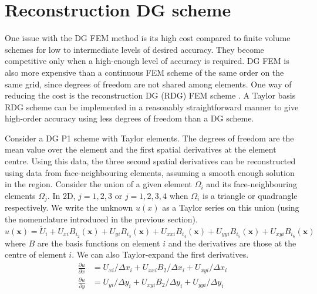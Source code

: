 \documentclass[11pt]{article}
\let\bld\boldsymbol
\begin{document}
\section{Reconstruction DG scheme}
One issue with the DG FEM method is its high cost compared to finite volume schemes for low to intermediate levels of desired accuracy. They become competitive only when a high-enough level of accuracy is required. DG FEM is also more expensive than a continuous FEM scheme of the same order on the same grid, since degrees of freedom are not shared among elements. One way of reducing the cost is the reconstruction DG (RDG) FEM scheme \cite{luo_rdg}. A Taylor basis RDG scheme can be implemented in a reasonably straightforward manner to give high-order accuracy using less degrees of freedom than a DG scheme.

Consider a DG P1 scheme with Taylor elements. The degrees of freedom are the mean value over the element and the first spatial derivatives at the element centre. Using this data, the three second spatial derivatives can be reconstructed using data from face-neighbouring elements, assuming a smooth enough solution in the region. Consider the union of a given element $\Omega_i$ and its face-neighbouring elements $\Omega_j$. In 2D, $j = 1,2,3$ or $j = 1,2,3,4$ when $\Omega_i$ is a triangle or quadrangle respectively. We write the unknown $u(x)$ as a Taylor series on this union (using the nomenclature introduced in the previous section).
\begin{equation}
u(\bld{x}) = \tilde{U}_i + U_{xi}B_{i_2}(\bld{x}) + U_{yi}B_{i_3}(\bld{x}) + U_{xxi} B_{i_4}(\bld{x}) + U_{yyi} B_{i_5}(\bld{x}) + U_{xyi} B_{i_6}(\bld{x})
\end{equation}
where $B$ are the basis functions on element $i$ and the derivatives are those at the centre of element $i$. We can also Taylor-expand the first derivatives.
\begin{align}
\frac{\partial u}{\partial x} &= U_{xi}/\Delta x_i + U_{xxi} B_2 / \Delta x_i + U_{xyi}/\Delta x_i \\
\frac{\partial u}{\partial y} &= U_{yi}/\Delta y_i + U_{xyi} B_2 / \Delta y_i + U_{yyi}/\Delta y_i
\end{align}
\end{document}
